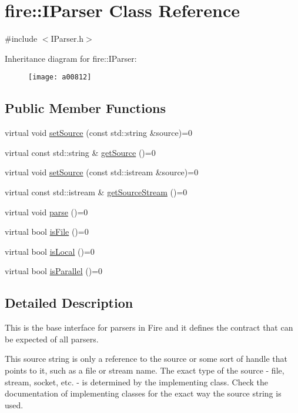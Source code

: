 \hypertarget{a00812}{}\section{fire\+:\+:I\+Parser Class Reference}
\label{a00812}


{\ttfamily \#include $<$I\+Parser.\+h$>$}

Inheritance diagram for fire\+:\+:I\+Parser\+:\begin{figure}[H]
\begin{center}
\leavevmode
\texttt{[image: a00812]}
\end{center}
\end{figure}
\subsection*{Public Member Functions}
\begin{DoxyCompactItemize}
\item 
virtual void \hyperlink{a00812_a0dbeff2b9bd8dbfb2aad7a424eef87d1}{set\+Source} (const std\+::string \&source)=0
\item 
virtual const std\+::string \& \hyperlink{a00812_ab55d2644dfa6d950d1f874e1e02df095}{get\+Source} ()=0
\item 
virtual void \hyperlink{a00812_a7748a633910e9bfc27411d6bd840496b}{set\+Source} (const std\+::istream \&source)=0
\item 
virtual const std\+::istream \& \hyperlink{a00812_ac94c7a288bf669322b93ba171c43f90e}{get\+Source\+Stream} ()=0
\item 
virtual void \hyperlink{a00812_af36ac6eedd8c27d2f418869193d7d03c}{parse} ()=0
\item 
virtual bool \hyperlink{a00812_a616c42c85d781c916e97f0ad8f1e9010}{is\+File} ()=0
\item 
virtual bool \hyperlink{a00812_a97b9e58493b3cadbc63e670b0b0e759f}{is\+Local} ()=0
\item 
virtual bool \hyperlink{a00812_a83d2882a466d694fb0aea3d846bcbed4}{is\+Parallel} ()=0
\end{DoxyCompactItemize}


\subsection{Detailed Description}
This is the base interface for parsers in Fire and it defines the contract that can be expected of all parsers.

This source string is only a reference to the source or some sort of handle that points to it, such as a file or stream name. The exact type of the source -\/ file, stream, socket, etc. -\/ is determined by the implementing class. Check the documentation of implementing classes for the exact way the source string is used.

